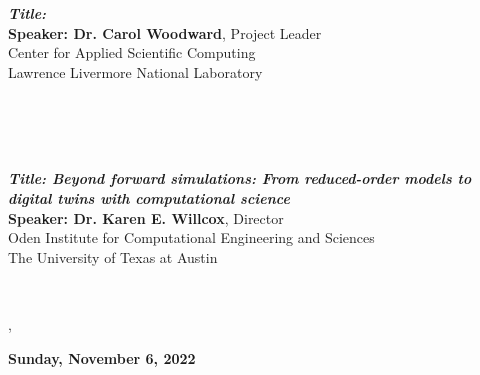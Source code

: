 \\[-10pt]
\\[-6pt]
\hspace*{0.13\textwidth}\parbox{0.94\textwidth}{{\bfseries\itshape Title:}\\
{\bf Speaker: Dr. Carol Woodward}, Project Leader\\
\hspace*{1.6cm}Center for Applied Scientific Computing\\
\hspace*{1.6cm}Lawrence Livermore National Laboratory
}\vspace{2ex}
\\[-10pt]
\\[-10pt]
\\[-6pt]
\hspace*{0.13\textwidth}\parbox{0.80\textwidth}{{\bfseries\itshape Title: Beyond forward simulations: From reduced-order models to digital twins with com\-pu\-tatio\-nal science}\\
{\bf Speaker: Dr. Karen E. Willcox}, Director\\
\hspace*{1.6cm}Oden Institute for Computational Engineering and Sciences\\
\hspace*{1.6cm}The University of Texas at Austin
}\hspace{0.20\textwidth}\vspace{2ex}

\\[-10pt]




,


\begin{center}
\large \bf Sunday, November 6, 2022
\end{center}

